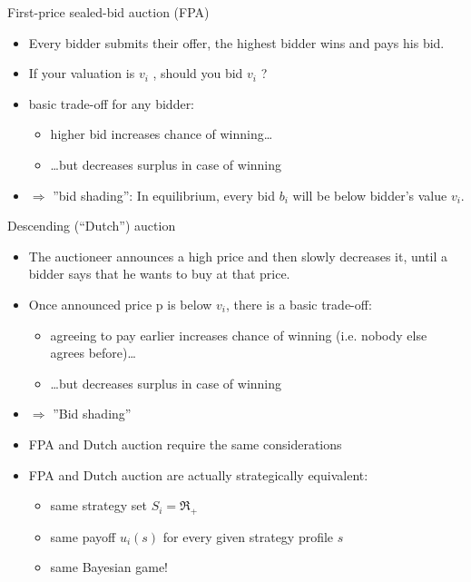 \documentclass[bigger]{beamer}
\newcommand{\Ra}{\Rightarrow} \newcommand{\ra}{\rightarrow} \newcommand{\Lra}{\Leftrightarrow}
\begin{document}
\begin{frame}[label={sec:org94b85ab}]{First-price sealed-bid auction (FPA)}
\begin{itemize}
\item Every bidder submits their offer, the highest bidder wins and pays his bid.
\item If your valuation is \(v_i\) , should you bid \(v_i\) ?
\pause
\item basic trade-off for any bidder:
\begin{itemize}
\item higher bid increases chance of winning\ldots{}
\item \ldots{}but decreases surplus in case of winning
\end{itemize}
\item \(\Ra\) ”bid shading”: In equilibrium, every bid \(b_i\) will be below bidder’s value \(v_i\).
\end{itemize}
\end{frame}

\begin{frame}[label={sec:org93b0686}]{Descending (“Dutch”) auction}
\begin{itemize}
\item The auctioneer announces a high price and then slowly decreases it, until a bidder says that he wants to buy at that price.
\item Once announced price p is below \(v_i\), there is a basic trade-off:
\begin{itemize}
\item agreeing to pay earlier increases chance of winning (i.e. nobody else agrees before)\ldots{}
\item \ldots{}but decreases surplus in case of winning
\end{itemize}
\item \(\Ra\) ”Bid shading”
\item FPA and Dutch auction require the same considerations
\item FPA and Dutch auction are actually strategically equivalent:
\begin{itemize}
\item same strategy set \(S_i=\Re_+\)
\item same payoff \(u_i(s)\) for every given strategy profile \(s\)
\item same Bayesian game!
\end{itemize}
\end{itemize}
\end{frame}
\end{document}
